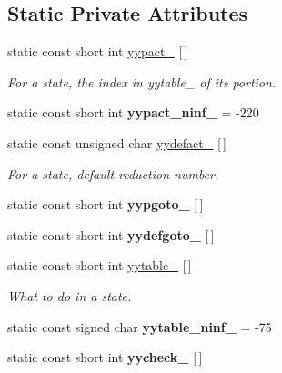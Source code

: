 \subsection*{Static Private Attributes}
\begin{DoxyCompactItemize}
\item 
\hypertarget{classyy_1_1CParser_a2da937f624e4432d57d9808d19cae8ca}{static const short int \hyperlink{classyy_1_1CParser_a2da937f624e4432d57d9808d19cae8ca}{yypact\-\_\-} \mbox{[}$\,$\mbox{]}}\label{classyy_1_1CParser_a2da937f624e4432d57d9808d19cae8ca}

\begin{DoxyCompactList}\small\item\em For a state, the index in {\itshape yytable\-\_\-} of its portion. \end{DoxyCompactList}\item 
\hypertarget{classyy_1_1CParser_afef9708f7fda66b9441b35ba57748385}{static const short int {\bfseries yypact\-\_\-ninf\-\_\-} = -\/220}\label{classyy_1_1CParser_afef9708f7fda66b9441b35ba57748385}

\item 
static const unsigned char \hyperlink{classyy_1_1CParser_a03107d161640c308322d688f6eb3401d}{yydefact\-\_\-} \mbox{[}$\,$\mbox{]}
\begin{DoxyCompactList}\small\item\em For a state, default reduction number. \end{DoxyCompactList}\item 
static const short int {\bfseries yypgoto\-\_\-} \mbox{[}$\,$\mbox{]}
\item 
static const short int {\bfseries yydefgoto\-\_\-} \mbox{[}$\,$\mbox{]}
\item 
static const short int \hyperlink{classyy_1_1CParser_adfba95c609c457df4ccbdc21f936d4c4}{yytable\-\_\-} \mbox{[}$\,$\mbox{]}
\begin{DoxyCompactList}\small\item\em What to do in a state. \end{DoxyCompactList}\item 
\hypertarget{classyy_1_1CParser_ac3daf6fcf6e8347873d6a89eedc8b6e9}{static const signed char {\bfseries yytable\-\_\-ninf\-\_\-} = -\/75}\label{classyy_1_1CParser_ac3daf6fcf6e8347873d6a89eedc8b6e9}

\item 
\hypertarget{classyy_1_1CParser_ada8307b4f271a63fd3074ed308186d59}{static const short int {\bfseries yycheck\-\_\-} \mbox{[}$\,$\mbox{]}}\label{classyy_1_1CParser_ada8307b4f271a63fd3074ed308186d59}


\end{DoxyCompactItemize}
